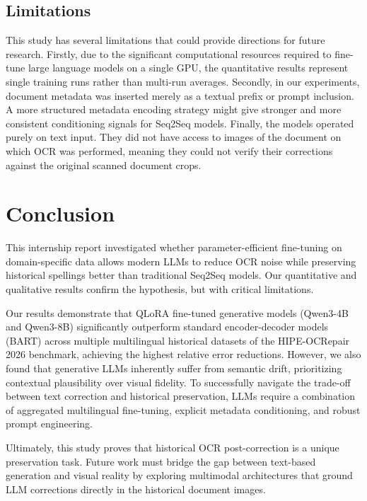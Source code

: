 \documentclass[11pt]{extarticle}
\begin{document}
\subsection{Limitations}
This study has several limitations that could provide directions for future research. Firstly, due to the significant computational resources required to fine-tune large language models on a single GPU, the quantitative results represent single training runs rather than multi-run averages. Secondly, in our experiments, document metadata was inserted merely as a textual prefix or prompt inclusion. A more structured metadata encoding strategy might give stronger and more consistent conditioning signals for Seq2Seq models. Finally, the models operated purely on text input. They did not have access to images of the document on which OCR was performed, meaning they could not verify their corrections against the original scanned document crops.

\section{Conclusion}

This internship report investigated whether parameter-efficient fine-tuning on domain-specific data allows modern LLMs to reduce OCR noise while preserving historical spellings better than traditional Seq2Seq models. Our quantitative and qualitative results confirm the hypothesis, but with critical limitations.

Our results demonstrate that QLoRA fine-tuned generative models (Qwen3-4B and Qwen3-8B) significantly outperform standard encoder-decoder models (BART) across multiple multilingual historical datasets of the HIPE-OCRepair 2026 benchmark, achieving the highest relative error reductions. However, we also found that generative LLMs inherently suffer from semantic drift, prioritizing contextual plausibility over visual fidelity. To successfully navigate the trade-off between text correction and historical preservation, LLMs require a combination of aggregated multilingual fine-tuning, explicit metadata conditioning, and robust prompt engineering. 

Ultimately, this study proves that historical OCR post-correction is a unique preservation task. Future work must bridge the gap between text-based generation and visual reality by exploring multimodal architectures that ground LLM corrections directly in the historical document images.
\end{document}
